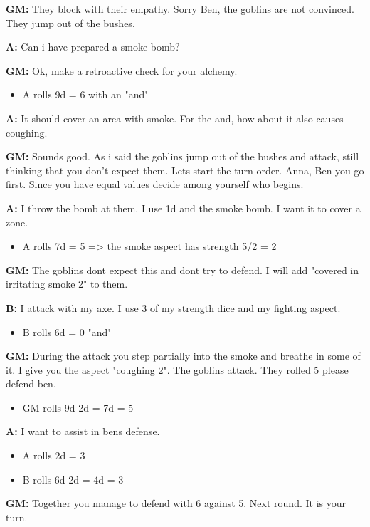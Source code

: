 \documentclass[11pt]{article}
\begin{document}
{\textbf{GM:} They block with their empathy. Sorry Ben, the goblins are not convinced. They jump out of the bushes.

\textbf{A:} Can i have prepared a smoke bomb?

\textbf{GM:} Ok, make a retroactive check for your alchemy.
\begin{itemize}
\item A rolls 9d = 6 with an "and"
\end{itemize}

\textbf{A:} It should cover an area with smoke. For the and, how about it also causes coughing.

\textbf{GM:} Sounds good. As i said the goblins jump out of the bushes and attack, still thinking that you don't expect them. Lets start the turn order. Anna, Ben you go first. Since you have equal values decide among yourself who begins.

\textbf{A:} I throw the bomb at them. I use 1d and the smoke bomb. I want it to cover a zone.
\begin{itemize}
\item A rolls 7d = 5 => the smoke aspect has strength 5/2 = 2
\end{itemize}

\textbf{GM:} The goblins dont expect this and dont try to defend. I will add "covered in irritating smoke 2" to them.

\textbf{B:} I attack with my axe. I use 3 of my strength dice and my fighting aspect.
\begin{itemize}
\item B rolls 6d = 0 "and"
\end{itemize}

\textbf{GM:} During the attack you step partially into the smoke and breathe in some of it. I give you the aspect "coughing 2". The goblins attack. They rolled 5 please defend ben.
\begin{itemize}
\item GM rolls 9d-2d = 7d = 5
\end{itemize}

\textbf{A:} I want to assist in bens defense.
\begin{itemize}
\item A rolls 2d = 3
\item B rolls 6d-2d = 4d = 3
\end{itemize}

\textbf{GM:} Together you manage to defend with 6 against 5. Next round. It is your turn.

}
\end{document}
